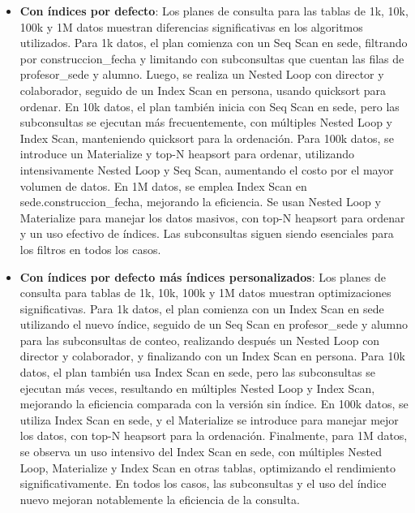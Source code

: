 \begin{itemize}
\begin{itemize}
            \item {\textbf{Con índices por defecto}: Los planes de consulta para las tablas de 1k, 10k, 100k y 1M datos muestran diferencias significativas en los algoritmos utilizados. Para 1k datos, el plan comienza con un Seq Scan en sede, filtrando por construccion\_fecha y limitando con subconsultas que cuentan las filas de profesor\_sede y alumno. Luego, se realiza un Nested Loop con director y colaborador, seguido de un Index Scan en persona, usando quicksort para ordenar. En 10k datos, el plan también inicia con Seq Scan en sede, pero las subconsultas se ejecutan más frecuentemente, con múltiples Nested Loop y Index Scan, manteniendo quicksort para la ordenación. Para 100k datos, se introduce un Materialize y top-N heapsort para ordenar, utilizando intensivamente Nested Loop y Seq Scan, aumentando el costo por el mayor volumen de datos. En 1M datos, se emplea Index Scan en sede.construccion\_fecha, mejorando la eficiencia. Se usan Nested Loop y Materialize para manejar los datos masivos, con top-N heapsort para ordenar y un uso efectivo de índices. Las subconsultas siguen siendo esenciales para los filtros en todos los casos.}
            \item {\textbf{Con índices por defecto más índices personalizados}: Los planes de consulta para tablas de 1k, 10k, 100k y 1M datos muestran optimizaciones significativas. Para 1k datos, el plan comienza con un Index Scan en sede utilizando el nuevo índice, seguido de un Seq Scan en profesor\_sede y alumno para las subconsultas de conteo, realizando después un Nested Loop con director y colaborador, y finalizando con un Index Scan en persona. Para 10k datos, el plan también usa Index Scan en sede, pero las subconsultas se ejecutan más veces, resultando en múltiples Nested Loop y Index Scan, mejorando la eficiencia comparada con la versión sin índice. En 100k datos, se utiliza Index Scan en sede, y el Materialize se introduce para manejar mejor los datos, con top-N heapsort para la ordenación. Finalmente, para 1M datos, se observa un uso intensivo del Index Scan en sede, con múltiples Nested Loop, Materialize y Index Scan en otras tablas, optimizando el rendimiento significativamente. En todos los casos, las subconsultas y el uso del índice nuevo mejoran notablemente la eficiencia de la consulta.}
      \end{itemize}
\end{itemize}
